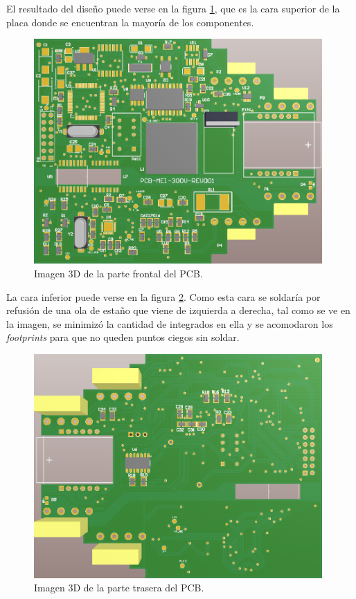 
El resultado del diseño puede verse en la figura \ref{fig:PCBfrontt}, que es la cara superior de la placa donde se encuentran la mayoría de los componentes. 

\begin{figure}[!htb]
	\centering
	\includegraphics[width=110mm,keepaspectratio]{Figures/PCBfront.png}
	\caption{Imagen 3D de la parte frontal del PCB.}
	\label{fig:PCBfrontt}
\end{figure}

La cara inferior puede verse en la figura \ref{fig:PCBbackk}. Como esta cara se soldaría por refusión de una ola de estaño que viene de izquierda a derecha, tal como se ve en la imagen, se minimizó la cantidad de integrados en ella y se acomodaron los \textit{footprints} para que no queden puntos ciegos sin soldar.

\begin{figure}[!htb]
	\centering
	\includegraphics[width=110mm,keepaspectratio]{Figures/PCBback.png}
	\caption{Imagen 3D de la parte trasera del PCB.}
	\label{fig:PCBbackk}
\end{figure}



